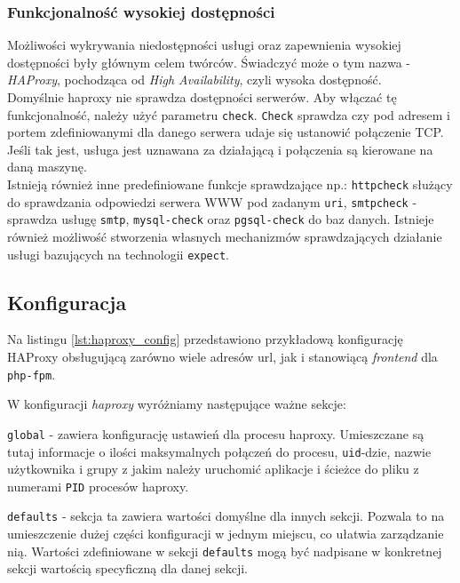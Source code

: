 {\subsubsection{Funkcjonalność wysokiej dostępności}
Możliwości wykrywania niedostępności usługi oraz zapewnienia wysokiej dostępności były głównym celem twórców.
Świadczyć może o tym nazwa - \textit{HAProxy}, pochodząca od \textit{High Availability}, czyli wysoka dostępność.\\

Domyślnie haproxy nie sprawdza dostępności serwerów. Aby włączać tę funkcjonalność, należy użyć parametru \texttt{check}.
\texttt{Check} sprawdza czy pod adresem i portem zdefiniowanymi dla danego serwera udaje się ustanowić połączenie TCP.
Jeśli tak jest, usługa jest uznawana za działającą i połączenia są kierowane na daną maszynę.\\

Istnieją również inne predefiniowane funkcje sprawdzające np.: \texttt{httpcheck} służący do sprawdzania odpowiedzi serwera WWW pod zadanym \texttt{uri}, \texttt{smtpcheck} - sprawdza usługę \texttt{smtp}, \texttt{mysql-check} oraz \texttt{pgsql-check} do baz danych.
Istnieje również możliwość stworzenia własnych mechanizmów sprawdzających działanie usługi bazujących na technologii \texttt{expect}.
\subsection{Konfiguracja}
\label{sec:haproxy_config}
Na listingu  \ref{lst:haproxy_config} przedstawiono przykładową konfigurację HAProxy obsługującą zarówno wiele adresów url, jak i stanowiącą \textit{frontend} dla \texttt{php-fpm}.

W konfiguracji \textit{haproxy} wyróżniamy następujące ważne sekcje:
\begin{description}
	\item{\texttt{global}} - 
		zawiera konfigurację ustawień dla procesu haproxy.
		Umieszczane są tutaj informacje o ilości maksymalnych połączeń do procesu, \texttt{uid}-dzie, nazwie użytkownika i grupy z jakim należy uruchomić aplikacje i ścieżce do pliku z numerami \texttt{PID} procesów haproxy.
	\item{\texttt{defaults}} - 
		sekcja ta zawiera wartości domyślne dla innych sekcji.
		Pozwala to na umieszczenie dużej części konfiguracji w jednym miejscu, co ułatwia zarządzanie nią.
		Wartości zdefiniowane w sekcji \texttt{defaults} mogą być nadpisane w konkretnej sekcji wartością specyficzną dla danej sekcji.\\
		

\end{description}}
